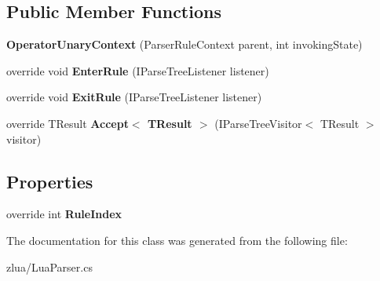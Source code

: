 \subsection*{Public Member Functions}
\begin{DoxyCompactItemize}
\item 
\mbox{\label{classzlua_1_1_lua_parser_1_1_operator_unary_context_a08e4449d7659cf379cfc243e4f5559d7}} 
{\bfseries Operator\+Unary\+Context} (Parser\+Rule\+Context parent, int invoking\+State)
\item 
\mbox{\label{classzlua_1_1_lua_parser_1_1_operator_unary_context_a3ddec96c75745ec9c065eb51f0b20bd6}} 
override void {\bfseries Enter\+Rule} (I\+Parse\+Tree\+Listener listener)
\item 
\mbox{\label{classzlua_1_1_lua_parser_1_1_operator_unary_context_a5925aacd7c607e7192c2416a162bbe5a}} 
override void {\bfseries Exit\+Rule} (I\+Parse\+Tree\+Listener listener)
\item 
\mbox{\label{classzlua_1_1_lua_parser_1_1_operator_unary_context_a6a23e0c47d41042b0c1f66b5b95a160e}} 
override T\+Result {\bfseries Accept$<$ T\+Result $>$} (I\+Parse\+Tree\+Visitor$<$ T\+Result $>$ visitor)
\end{DoxyCompactItemize}
\subsection*{Properties}
\begin{DoxyCompactItemize}
\item 
\mbox{\label{classzlua_1_1_lua_parser_1_1_operator_unary_context_a66621437b2cd97f2bbe51bc3d302c045}} 
override int {\bfseries Rule\+Index}
\end{DoxyCompactItemize}


The documentation for this class was generated from the following file\+:\begin{DoxyCompactItemize}
\item 
zlua/Lua\+Parser.\+cs\end{DoxyCompactItemize}
